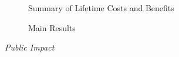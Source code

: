\begin{frame}\begin{figure}\caption{Summary of Lifetime Costs and Benefits}
\end{figure}\end{frame}
\begin{frame}\begin{figure}\caption{Main Results}
\end{figure}\end{frame}
\begin{frame}\begin{center}
\LARGE\textit{Public Impact}
\end{center}\end{frame}

